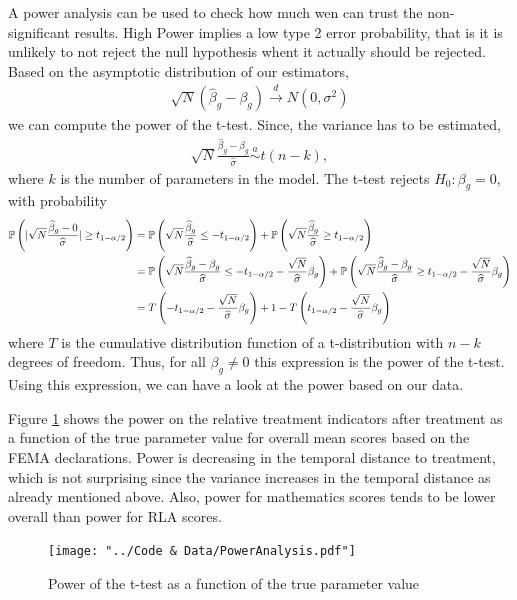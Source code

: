 A power analysis can be used to check how much wen can trust the non-significant results. High Power implies a low type 2 error probability, that is it is unlikely to not reject the null hypothesis whent it actually should be rejected. Based on the asymptotic distribution of our estimators,
\begin{align*}
	\sqrt{N} (\widehat{\beta}_{g} - \beta_{g}) \overset{d}{\to} N(0, \sigma^2)
\end{align*}
we can compute the power of the t-test. Since, the variance has to be estimated, 
\begin{align*}
	\sqrt{N} \frac{\widehat{\beta}_{g} - \beta_{g}}{\widehat{\sigma}} \overset{a}{\sim} t(n-k),
\end{align*}
where $k$ is the number of parameters in the model. The t-test rejects $H_0: \beta_g = 0$, with probability
\begin{align*}
	\mathbb{P} \left( \lvert \sqrt{N} \frac{\widehat{\beta}_{g} - 0}{\widehat{\sigma}} \rvert \geq t_{1-\alpha/2}  \right) &= \mathbb{P} \left(  \sqrt{N} \frac{\widehat{\beta}_{g}}{\widehat{\sigma}}  \leq -t_{1-\alpha/2}  \right) + \mathbb{P} \left( \sqrt{N} \frac{\widehat{\beta}_{g}}{\widehat{\sigma}} \geq t_{1-\alpha/2}  \right) \\
	&= \mathbb{P} \left(  \sqrt{N} \frac{\widehat{\beta}_{g} - \beta_g}{\widehat{\sigma}}  \leq -t_{1-\alpha/2} - \frac{\sqrt{N}}{\widehat{\sigma}} \beta_{g}  \right) + \mathbb{P} \left( \sqrt{N} \frac{\widehat{\beta}_{g} - \beta_g}{\widehat{\sigma}} \geq t_{1-\alpha/2}  - \frac{\sqrt{N}}{\widehat{\sigma}} \beta_{g} \right) \\
	&= T\left( -t_{1-\alpha/2} - \frac{\sqrt{N}}{\widehat{\sigma}} \beta_{g} \right) + 1 - T \left(  t_{1-\alpha/2}  - \frac{\sqrt{N}}{\widehat{\sigma}} \beta_{g} \right)
\end{align*}
where $T$ is the cumulative distribution function of a t-distribution with $n-k$ degrees of freedom. Thus, for all $\beta_g \neq 0$ this expression is the power of the t-test. Using this expression, we can have a look at the power based on our data.

Figure \ref{Power} shows the power on the relative treatment indicators after treatment as a function of the true parameter value for overall mean scores based on the FEMA declarations. Power is decreasing in the temporal distance to treatment, which is not surprising since the variance increases in the temporal distance as already mentioned above. Also, power for mathematics scores tends to be lower overall than power for RLA scores. 


\begin{figure}[!h]
	\centering
	\texttt{[image: "../Code \& Data/PowerAnalysis.pdf"]}
	\caption{Power of the t-test as a function of the true parameter value}
	\label{Power}
\end{figure}





